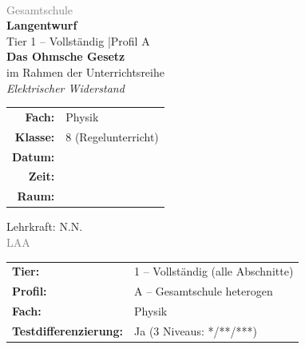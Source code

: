 \documentclass[11pt,a4paper]{article}
\newcommand{\plantier}{1}
\newcommand{\lerngruppenprofil}{A}
\newcommand{\fach}{Physik}
\newcommand{\jahrgangsstufe}{8}
\newcommand{\schulart}{Gesamtschule}
\newcommand{\kursart}{Regelunterricht}
\newcommand{\stundenthema}{Das Ohmsche Gesetz}
\newcommand{\reihenthema}{Elektrischer Widerstand}
\newcommand{\lehrkraft}{N.N.}
\newcommand{\ausbildungsstand}{LAA}
\begin{document}
\begin{titlepage}
    \centering
    \vspace*{2cm}

    {\Large\textcolor{gray}{}}\\[0.5cm]
    {\large\textcolor{gray}{\schulart}}\\[2cm]

    {\Huge\textcolor{fach}{\textbf{Langentwurf}}}\\[0.5cm]
    {\large Tier \plantier{} -- Vollständig \quad|\quad Profil \lerngruppenprofil}\\[2cm]

    {\LARGE\textbf{\stundenthema}}\\[0.5cm]
    {\large im Rahmen der Unterrichtsreihe}\\[0.3cm]
    {\Large\textit{\reihenthema}}\\[2cm]

    \begin{tabular}{rl}
        \textbf{Fach:} & \fach \\[0.3cm]
        \textbf{Klasse:} & \jahrgangsstufe{} (\kursart) \\[0.3cm]
        \textbf{Datum:} & \underline{\hspace{3cm}} \\[0.3cm]
        \textbf{Zeit:} & \underline{\hspace{3cm}} \\[0.3cm]
        \textbf{Raum:} & \underline{\hspace{3cm}} \\[0.3cm]
    \end{tabular}

    \vfill

    {\large Lehrkraft: \lehrkraft}\\[0.3cm]
    {\normalsize\textcolor{gray}{\ausbildungsstand}}\\[1cm]

\end{titlepage}

\tableofcontents
\newpage

\begin{infobox}
\begin{tabular}{ll}
    \textbf{Tier:} & 1 -- Vollständig (alle Abschnitte) \\[0.3em]
    \textbf{Profil:} & A -- Gesamtschule heterogen \\[0.3em]
    \textbf{Fach:} & Physik \\[0.3em]
    \textbf{Testdifferenzierung:} & Ja (3 Niveaus: */**/***)
\end{tabular}
\end{infobox}
\end{document}
